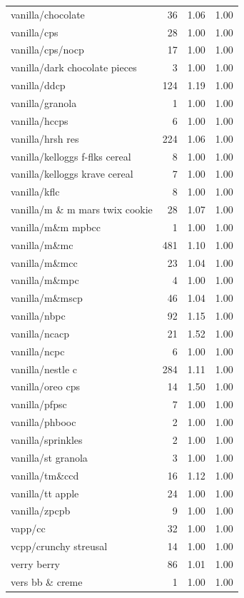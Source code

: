\begin{table}
\begin{tabular}{lrrr}
vanilla/chocolate & 36 & 1.06 & 1.00 \\
vanilla/cps & 28 & 1.00 & 1.00 \\
vanilla/cps/nocp & 17 & 1.00 & 1.00 \\
vanilla/dark chocolate pieces & 3 & 1.00 & 1.00 \\
vanilla/ddcp & 124 & 1.19 & 1.00 \\
vanilla/granola & 1 & 1.00 & 1.00 \\
vanilla/hccps & 6 & 1.00 & 1.00 \\
vanilla/hrsh res & 224 & 1.06 & 1.00 \\
vanilla/kelloggs f-flks cereal & 8 & 1.00 & 1.00 \\
vanilla/kelloggs krave cereal & 7 & 1.00 & 1.00 \\
vanilla/kflc & 8 & 1.00 & 1.00 \\
vanilla/m \& m mars twix cookie & 28 & 1.07 & 1.00 \\
vanilla/m\&m mpbcc & 1 & 1.00 & 1.00 \\
vanilla/m\&mc & 481 & 1.10 & 1.00 \\
vanilla/m\&mcc & 23 & 1.04 & 1.00 \\
vanilla/m\&mpc & 4 & 1.00 & 1.00 \\
vanilla/m\&mscp & 46 & 1.04 & 1.00 \\
vanilla/nbpc & 92 & 1.15 & 1.00 \\
vanilla/ncacp & 21 & 1.52 & 1.00 \\
vanilla/ncpc & 6 & 1.00 & 1.00 \\
vanilla/nestle c & 284 & 1.11 & 1.00 \\
vanilla/oreo cps & 14 & 1.50 & 1.00 \\
vanilla/pfpsc & 7 & 1.00 & 1.00 \\
vanilla/phbooc & 2 & 1.00 & 1.00 \\
vanilla/sprinkles & 2 & 1.00 & 1.00 \\
vanilla/st granola & 3 & 1.00 & 1.00 \\
vanilla/tm\&ccd & 16 & 1.12 & 1.00 \\
vanilla/tt apple & 24 & 1.00 & 1.00 \\
vanilla/zpcpb & 9 & 1.00 & 1.00 \\
vapp/cc & 32 & 1.00 & 1.00 \\
vcpp/crunchy streusal & 14 & 1.00 & 1.00 \\
verry berry & 86 & 1.01 & 1.00 \\
vers bb \& creme & 1 & 1.00 & 1.00 \\

\end{tabular}
\end{table}
